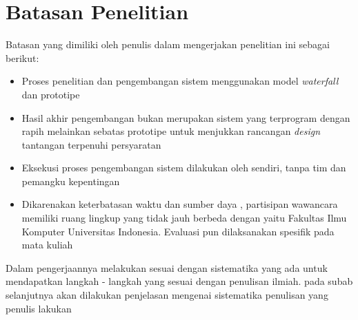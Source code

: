 \section{Batasan Penelitian}
Batasan yang dimiliki oleh penulis dalam mengerjakan penelitian ini sebagai berikut:
\begin{itemize}
	\item Proses penelitian dan pengembangan sistem menggunakan model \textit{waterfall} dan prototipe
	\item Hasil akhir pengembangan bukan merupakan sistem yang terprogram dengan rapih melainkan sebatas prototipe untuk menjukkan rancangan \textit{design} tantangan terpenuhi persyaratan
	\item Eksekusi proses pengembangan sistem dilakukan oleh \saya sendiri, tanpa tim dan pemangku kepentingan
	\item Dikarenakan keterbatasan waktu dan sumber daya \saya, partisipan wawancara memiliki ruang lingkup yang tidak jauh berbeda dengan \saya yaitu Fakultas Ilmu Komputer Universitas Indonesia. Evaluasi pun dilaksanakan spesifik pada mata kuliah \ddp
\end{itemize}
Dalam pengerjaannya \saya melakukan sesuai dengan sistematika yang ada untuk mendapatkan langkah - langkah yang sesuai dengan penulisan ilmiah. pada subab selanjutnya akan dilakukan penjelasan mengenai sistematika penulisan yang penulis lakukan
